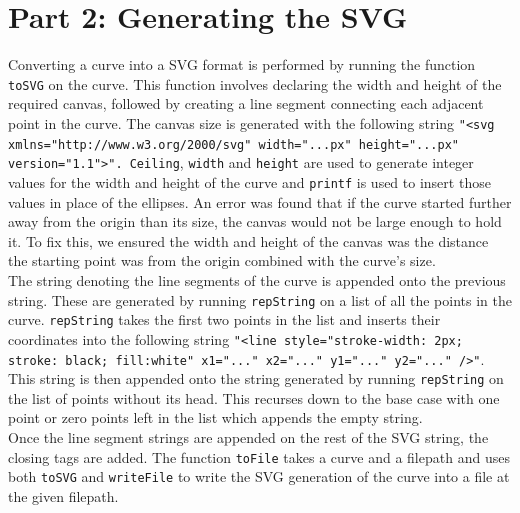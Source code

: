 \documentclass{article}
\begin{document}
\section*{Part 2: Generating the SVG}
Converting a curve into a SVG format is performed by running the function \texttt{toSVG} on the curve. This function involves declaring the width and height of the required canvas, followed by creating a line segment connecting each adjacent point in the curve. The canvas size is generated with the following string \texttt{"<svg xmlns="http://www.w3.org/2000/svg" width="...px" height="...px" version="1.1">". Ceiling}, \texttt{width} and \texttt{height} are used to generate integer values for the width and height of the curve and \texttt{printf} is used to insert those values in place of the ellipses. An error was found that if the curve started further away from the origin than its size, the canvas would not be large enough to hold it. To fix this, we ensured the width and height of the canvas was the distance the starting point was from the origin combined with the curve's size.\\


The string denoting the line segments of the curve is appended onto the previous string. These are generated by running \texttt{repString} on a list of all the points in the curve. \texttt{repString} takes the first two points in the list and inserts their coordinates into the following string \texttt{"<line style="stroke-width: 2px; stroke: black; fill:white" x1="..." x2="..." y1="..." y2="..." />"}. This string is then appended onto the string generated by running \texttt{repString} on the list of points without its head. This recurses down to the base case with one point or zero points left in the list which appends the empty string.\\


Once the line segment strings are appended on the rest of the SVG string, the closing tags are added. The function \texttt{toFile} takes a curve and a filepath and uses both \texttt{toSVG} and \texttt{writeFile} to write the SVG generation of the curve into a file at the given filepath.
\end{document}
